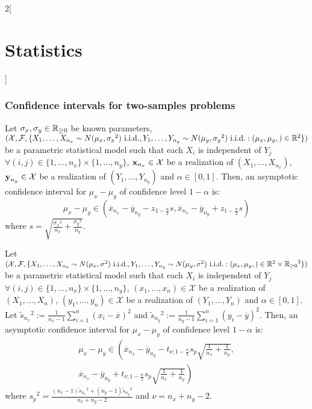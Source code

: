 \documentclass[../../../main_math.tex]{subfiles}
\begin{document}
\begin{multicols}{2}[\section{Statistics}]
  \subsubsection{Confidence intervals for two-samples problems}
  \begin{proposition}
    Let $\sigma_x,\sigma_y\in\mathbb{R}_{\geq 0}$ be known parameters, $(\mathcal{X},\mathcal{F},\{X_1,\ldots,X_{n_x}\sim N(\mu_x,{\sigma_x}^2)\text{ i.i.d.},Y_1,\ldots,Y_{n_y}\sim N(\mu_y,{\sigma_y}^2)\text{ i.i.d.}:(\mu_x,\mu_y,)\in\mathbb{R}^2\})$ be a parametric statistical model such that each $X_i$ is independent of $Y_j$ $\forall (i,j)\in\{1,\ldots,n_x\}\times\{1,\ldots,n_y\}$, $\boldsymbol{\mathrm{x}}_{n_x}\in\mathcal{X}$ be a realization of $(X_1,\ldots,X_{n_x})$, $\boldsymbol{\mathrm{y}}_{n_y}\in\mathcal{X}$ be a realization of $(Y_1,\ldots,Y_{n_y})$ and $\alpha\in[0,1]$. Then, an asymptotic confidence interval for $\mu_x-\mu_y$ of confidence level $1-\alpha$ is:
    $$\mu_x-\mu_y\in\left(\overline{x}_{n_x}-\overline{y}_{n_y}-z_{1-\frac{\alpha}{2}}s,\overline{x}_{n_x}-\overline{y}_{n_y}+z_{1-\frac{\alpha}{2}}s\right)$$ where $s=\sqrt{\frac{{\sigma_x}^2}{n_x}+\frac{{\sigma_y}^2}{n_y}}$.
  \end{proposition}
  \begin{proposition}
    Let $(\mathcal{X},\mathcal{F},\{X_1,\ldots,X_{n_x}\sim N(\mu_x,\sigma^2)\text{ i.i.d.},Y_1,\ldots,Y_{n_y}\sim N(\mu_y,\sigma^2)\text{ i.i.d.}:(\mu_x,\mu_y,)\in\mathbb{R}^2\times{\ensuremath{\mathbb{R}}_{\geq 0}}^2\})$ be a parametric statistical model such that each $X_i$ is independent of $Y_j$ $\forall (i,j)\in\{1,\ldots,n_x\}\times\{1,\ldots,n_y\}$, $(x_1,\ldots,x_n)\in\mathcal{X}$ be a realization of $(X_1,\ldots,X_{n})$, $(y_1,\ldots,y_n)\in\mathcal{X}$ be a realization of $(Y_1,\ldots,Y_{n})$ and $\alpha\in[0,1]$. Let $\tilde{s}_{n_x}{}^2:=\frac{1}{n_x-1}\sum_{i=1}^n{(x_i-\overline{x})}^2$ and $\tilde{s}_{n_y}{}^2:=\frac{1}{n_y-1}\sum_{i=1}^n{(y_i-\overline{y})}^2$. Then, an asymptotic confidence interval for $\mu_x-\mu_y$ of confidence level $1-\alpha$ is:
    \begin{multline*}
      \mu_x-\mu_y\in\left(\overline{x}_{n_x}-\overline{y}_{n_y}-t_{\nu;1-\frac{\alpha}{2}}s_p\sqrt{\frac{1}{n_x}+\frac{1}{n_y}},\right.\\\left.\overline{x}_{n_x}-\overline{y}_{n_y}+t_{\nu;1-\frac{\alpha}{2}}s_p\sqrt{\frac{1}{n_x}+\frac{1}{n_y}}\right)
    \end{multline*}
    where ${s_p}^2=\frac{(n_x-1)\tilde{s}_{n_x}{}^2+(n_y-1)\tilde{s}_{n_y}{}^2}{n_x+n_y-2}$ and $\nu=n_x+n_y-2$.

\end{proposition}
\end{multicols}
\end{document}
